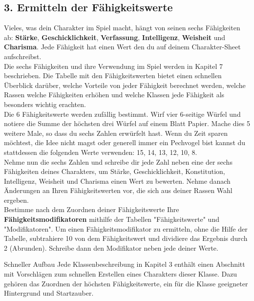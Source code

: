 \subsection{3. Ermitteln der Fähigkeitswerte}
Vieles, was dein Charakter im Spiel macht, hängt von seinen sechs Fähigkeiten ab:
\textbf{Stärke}, \textbf{Geschicklichkeit}, \textbf{Verfassung}, \textbf{Intelligenz}, \textbf{Weisheit} und \textbf{Charisma}. Jede Fähigkeit hat einen Wert den du	auf deinem Charakter-Sheet aufschreibst. \\
Die sechs Fähigkeiten und ihre Verwendung im Spiel werden in Kapitel 7 beschrieben. Die Tabelle mit den Fähigkeitswerten bietet einen schnellen Überblick darüber, welche Vorteile von jeder Fähigkeit berechnet werden, welche Rassen welche Fähigkeiten erhöhen und welche Klassen jede Fähigkeit als besonders wichtig erachten.\\
Die 6 Fähigkeitswerte werden zufällig bestimmt. Wirf vier 6-seitige Würfel und notiere die Summe der höchsten drei Würfel auf einem Blatt Papier.
Mache dies 5 weitere Male, so dass du sechs Zahlen erwürfelt hast. Wenn du Zeit sparen möchtest, die Idee nicht magst oder generell immer ein Pechvogel bist kannst du stattdessen die folgenden Werte verwenden: 15, 14, 13, 12, 10, 8.\\
Nehme nun die sechs Zahlen und schreibe dir jede Zahl neben eine der sechs Fähigkeiten deines Charakters, um Stärke, Geschicklichkeit, Konstitution, Intelligenz, Weisheit und Charisma einen Wert zu bewerten. Nehme danach Änderungen an Ihren Fähigkeitswerten vor, die sich aus deiner Rassen Wahl ergeben.\\
Bestimme nach dem Zuordnen deiner Fähigkeitswerte Ihre \textbf{Fähigkeitsmodifikatoren} mithilfe der Tabellen "Fähigkeitswerte" und "Modifikatoren". Um einen Fähigkeitsmodifikator zu ermitteln, ohne die Hilfe der Tabelle, subtrahiere 10 von dem Fähigkeitswert und dividiere das Ergebnis durch 2 (Abrunden). Schreibe dann den Modifikator neben jede deiner Werte.
\newpage
\begin{commentbox}{Schneller Aufbau}
Jede Klassenbeschreibung in Kapitel 3 enthält einen Abschnitt mit Vorschlägen zum schnellen Erstellen eines Charakters dieser Klasse. Dazu gehören das Zuordnen der höchsten Fähigkeitswerte, ein für die Klasse geeigneter Hintergrund und Startzauber.
\end{commentbox}

